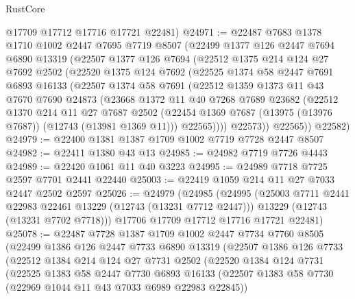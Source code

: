 \begin{lexlean}{RustCore}
\begin{coremodule}
      @17709
      @17712
      @17716
      @17721
      @22481)
@24971 := @22487
    @7683
    @1378
    @1710
    @1002
    @2447
    @7695
    @7719
    @8507
    (@22499
      @1377
      @126
      @2447
      @7694
      @6890
      @13319
      (@22507
        @1377
        @126
        @7694
        (@22512
          @1375
          @214
          @124
          @27
          @7692
          @2502
          (@22520
            @1375
            @124
            @7692
            (@22525
              @1374
              @58
              @2447
              @7691
              @6893
              @16133
              (@22507
                @1374
                @58
                @7691
                (@22512
                  @1359
                  @1373
                  @11
                  @43
                  @7670
                  @7690
                  @24873
                  (@23668
                    @1372
                    @11
                    @40
                    @7268
                    @7689
                    @23682
                    (@22512
                      @1370
                      @214
                      @11
                      @27
                      @7687
                      @2502
                      (@22454 @1369 @7687 (@13975 (@13976 @7687)) (@12743 (@13981 @1369 @11)))
                      @22565))))
              @22573))
          @22565))
      @22582)
@24979 := @22400 @1381 @1387 @1709 @1002 @7719 @7728 @2447 @8507
@24982 := @22411 @1380 @43 @13
@24985 := @24982 @7719 @7726 @4443
@24989 := @22420 @1061 @11 @40 @3223
@24995 := @24989 @7718 @7725 @2597 @7701 @2441 @22440
@25003 := @22419 @1059 @214 @11 @27 @7033 @2447 @2502 @2597
@25026 := @24979
    (@24985
      (@24995
        (@25003 @7711 @2441 @22983 @22461 @13229 (@12743 (@13231 @7712 @2447)))
        @13229
        (@12743 (@13231 @7702 @7718)))
      @17706
      @17709
      @17712
      @17716
      @17721
      @22481)
@25078 := @22487
    @7728
    @1387
    @1709
    @1002
    @2447
    @7734
    @7760
    @8505
    (@22499
      @1386
      @126
      @2447
      @7733
      @6890
      @13319
      (@22507
        @1386
        @126
        @7733
        (@22512
          @1384
          @214
          @124
          @27
          @7731
          @2502
          (@22520
            @1384
            @124
            @7731
            (@22525
              @1383
              @58
              @2447
              @7730
              @6893
              @16133
              (@22507 @1383 @58 @7730 (@22969 @1044 @11 @43 @7033 @6989 @22983 @22845))

\end{coremodule}
\end{lexlean}
